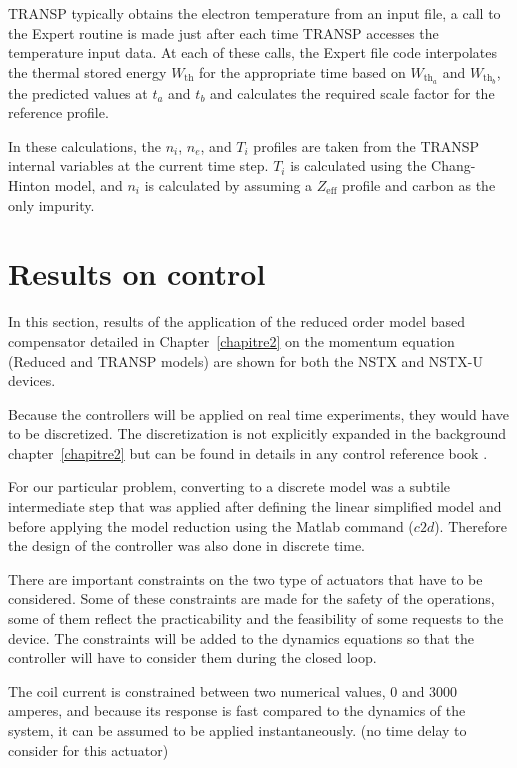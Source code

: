 \documentclass[12pt,lot, lof]{puthesis}
\begin{document}
TRANSP typically obtains the electron temperature from an input file, a call to the Expert routine is made just after each time TRANSP accesses the temperature input data. At each of these calls, the Expert file code interpolates the thermal stored energy $W_\text{th}$ for the appropriate time based on $W_{\text{th}_a}$ and $W_{\text{th}_b}$, the predicted values at $t_a$ and $t_b$ and calculates the required scale factor for the reference profile.

In these calculations, the $n_i$, $n_e$, and $T_i$ profiles are taken from the TRANSP internal variables at the current time step. $T_i$ is calculated using the Chang-Hinton model, and $n_i$ is calculated by assuming a $Z_\text{eff}$ profile and carbon as the only impurity.

\section{Results on control}

In this section, results of the application of the reduced order model based compensator detailed in Chapter~\ref{chapitre2} on the momentum equation (Reduced and TRANSP models) are shown for both the NSTX and NSTX-U devices.

Because the controllers will be applied on real time experiments, they would have to be discretized. The discretization is not explicitly expanded in the background chapter~\ref{chapitre2} but can be found in details in any control reference book \cite{AandM, SandP}.

For our particular problem, converting to a discrete model was a subtile intermediate step that was applied after defining the linear simplified model and before applying the model reduction using the Matlab command ($c2d$). Therefore the design of the controller was also done in discrete time.

There are important constraints on the two type of actuators that have to be considered. Some of these constraints are made for the safety of the operations, some of them reflect the practicability and the feasibility of some requests to the device. The constraints will be added to the dynamics equations so that the controller will have to consider them during the closed loop.

The coil current is constrained between two numerical values, 0 and 3000 amperes, and because its response is fast compared to the dynamics of the system, it can be assumed to be applied instantaneously. (no time delay to consider for this actuator)
\end{document}
